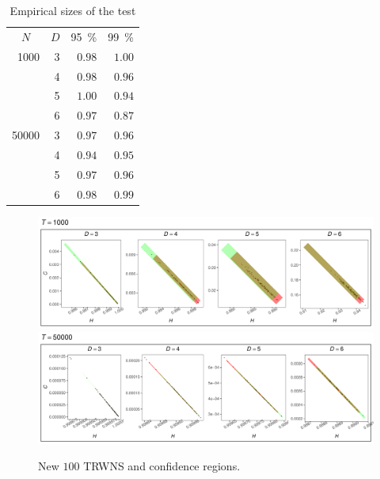 \documentclass[alpha-refs]{wiley-article}
\begin{document}
\begin{table}[hbt]
	\centering
	\caption{Empirical sizes of the test}
	\label{tab:result1}
	\begin{tabular}{*{3}rr}
		\toprule
		\multicolumn{1}{c}{$N$} & \multicolumn{1}{c}{$D$} & \multicolumn{1}{c}{\SI{95}{\percent}} & \multicolumn{1}{c}{\SI{99}{\percent}}\\
		\cmidrule(lr){1-1}
		\cmidrule(lr){2-2}
		\cmidrule(lr){3-3}
		\cmidrule(lr){4-4}
		1000 & 3 & $0.98$ & $1.00$\\
		& 4 & $0.98$ & $0.96$\\
		& 5 & $1.00$ & $0.94$\\
		& 6 & $0.97$ & $0.87$\\
		\cmidrule(lr){1-4} 
		50000 & 3 & $0.97$ & $0.96$\\
		& 4 & $0.94$ & $0.95$\\
		& 5 & $0.97$ & $0.96$\\ 
		& 6 & $0.98$ & $0.99$\\ 
		\bottomrule
	\end{tabular}
\end{table}

\begin{figure}[hbt]
	\centering
	\includegraphics[width=\linewidth]{Figures/RNG-1000.pdf}
	\includegraphics[width=\linewidth]{Figures/RNG-50000.pdf}
	\caption{New $100$ TRWNS and confidence regions.}
	\label{fig:RNG}
\end{figure}
\end{document}
